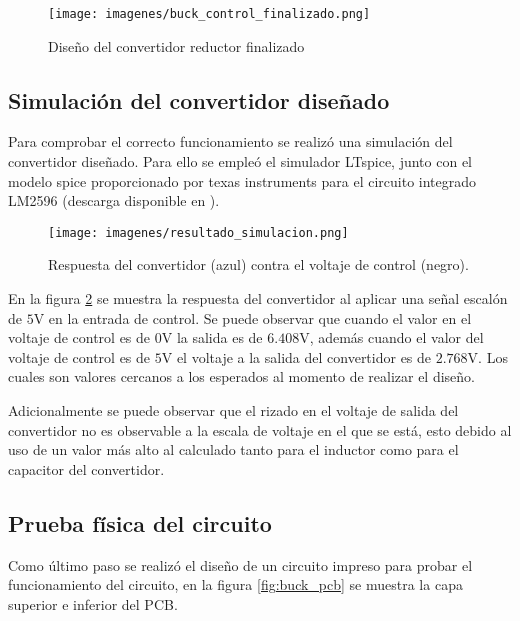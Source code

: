 \begin{figure}[H]
    \centering

    \texttt{[image: imagenes/buck\_control\_finalizado.png]}
    \caption{Diseño del convertidor reductor finalizado}
    \label{fig:buck_finalizado}
\end{figure}

\subsection{Simulación del convertidor diseñado}

Para comprobar el correcto funcionamiento se realizó una simulación del 
convertidor diseñado. Para ello se empleó el simulador LTspice, junto con 
el modelo spice proporcionado por texas instruments para el circuito integrado
LM2596 (descarga disponible en \cite{noauthor_lm2596_nodate}). 

\begin{figure}[H]
    \centering
    \texttt{[image: imagenes/resultado\_simulacion.png]}
    \caption{Respuesta del convertidor (azul) contra el voltaje de control
            (negro).}
    \label{fig:sim_buck}
\end{figure}

En la figura \ref{fig:sim_buck} se muestra la respuesta del convertidor al
aplicar una señal escalón de $5\text{V}$ en la entrada de control. Se puede
observar que cuando el valor en el voltaje de control es de $0\text{V}$
la salida es de $6.408\text{V}$, además
cuando el valor del voltaje de control es de $5\text{V}$ el voltaje a la salida
del convertidor es de $2.768\text{V}$. Los cuales son valores cercanos a los esperados
al momento de realizar el diseño. 

Adicionalmente se puede observar que el rizado en el voltaje de salida del 
convertidor no es observable a la escala de voltaje en el que se está, esto debido
al uso de un valor más alto al calculado tanto para el inductor como para el 
capacitor del convertidor.

                                                                
\subsection{Prueba física del circuito}

Como último paso se realizó el diseño de un circuito impreso para probar el 
funcionamiento del circuito, en la figura \ref{fig:buck_pcb} se muestra la capa
superior e inferior del PCB.

